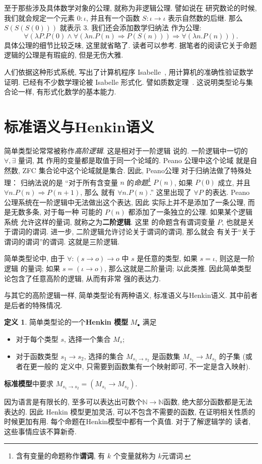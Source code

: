 \documentclass[UTF8]{ctexbook}
\theoremstyle{plain}
\theoremstyle{definition}
\newtheorem{definition}{定义}[chapter]
\theoremstyle{remark}
\begin{document}
至于那些涉及具体数学对象的公理, 就称为非逻辑公理. 譬如说在
研究数论的时候, 我们就会规定一个元素 \(0 : \iota\),
并且有一个函数 \(S : \iota \to \iota\) 表示自然数的后继.
那么 \(S(S(S(0)))\) 就表示 \(3\). 我们还会添加数学归纳法
作为公理:
\[\forall (\lambda P. P(0) \wedge
\forall(\lambda n. P(n)\Rightarrow P(S(n)))
\Rightarrow \forall (\lambda n. P(n))).\]
具体公理的细节比较乏味, 这里就省略了. 读者可以参考\cite{farmer:2008:virtues}.
据笔者的阅读它关于命题逻辑的公理是有瑕疵的, 但是无伤大雅.

人们依据这种形式系统, 写出了计算机程序 Isabelle~\cite{tobias:2002:isabelle},
用计算机的准确性验证数学证明. 已经有不少数学理论被 Isabelle 形式化.
譬如质数定理~\cite{eberl:2018:pnt}. 这说明类型论与集合论一样,
有形式化数学的基本能力.

\section{标准语义与Henkin语义}\label{beginning:henkin}
简单类型论常常被称作\emph{高阶逻辑}. 这是相对于一阶逻辑
说的. 一阶逻辑中一切的 \(\forall, \exists\) 量词, 其
作用的变量都是取值于同一个论域的. Peano 公理中这个论域
就是自然数, ZFC 集合论中这个论域就是集合. 因此, Peano公理
对于归纳法做了特殊处理： 归纳法说的是 “对于所有含变量
\(n\) 的\emph{命题}\footnote{含有变量的命题称作\textbf{谓词},
有 \(k\) 个变量就称为 \(k\)元谓词.}
\(P(n)\), 如果 \(P(0)\) 成立,
并且 \(\forall n. P(n) \Rightarrow P(n+1)\), 那么
就有 \(\forall n. P(n)\).” 这里出现了 \(\forall P\)
的表达. Peano 公理系统在一阶逻辑中无法做出这个表达, 因此
实际上并不是添加了一条公理, 而是无数多条, 对于每一种
可能的 \(P(n)\) 都添加了一条独立的公理. 如果某个逻辑系统
允许这样的量词, 就称之为\textbf{二阶逻辑}. 这里
的命题含有谓词变量 \(P\), 也就是关于谓词的谓词.
进一步, 二阶逻辑允许讨论关于谓词的谓词, 那么就会
有关于“关于谓词的谓词”的谓词. 这就是三阶逻辑.

简单类型论中, 由于 \(\forall : (s \to o) \to o\) 中
\(s\) 是任意的类型, 如果 \(s = \iota\), 则这是一阶逻辑
的量词; 如果 \(s = (\iota \to o)\), 那么这就是二阶量词;
以此类推. 因此简单类型论包含了任意高阶的逻辑, 从而有非常
强的表达力.

与其它的高阶逻辑一样, 简单类型论有两种语义, 标准语义与Henkin语义.
其中前者是后者的特殊情况.

\begin{definition}
简单类型论的一个\textbf{Henkin 模型} \(M_\bullet\) 满足
\begin{itemize}
\item 对于每个类型 \(s\), 选择一个集合 \(M_s\);
\item 对于函数类型 \(s_1 \to s_2\), 选择的集合 \(M_{s_1 \to s_2}\)
是函数集 \(M_{s_1} \to M_{s_2}\) 的子集 (或者在更一般的
定义中, 只需要到函数集有一个映射即可, 不一定是含入映射).
\end{itemize}
\textbf{标准模型}中要求 \(M_{s_1 \to s_2} = (M_{s_1} \to M_{s_2})\).
\end{definition}
因为语言是有限长的, 至多可以表达出可数个\(\mathbb N \to \mathbb N\)函数,
绝大部分函数都是无法表达的. 因此 Henkin 模型更加灵活,
可以不包含不需要的函数, 在证明相关性质的时候更加有用.
每个命题在Henkin模型中都有一个真值. 对于了解逻辑学的
读者, 这些事情应该不算新奇.
\end{document}
